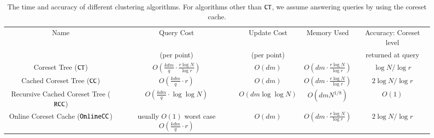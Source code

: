 \begin{table*}[ht]
{
\small
\centering
\begin{tabular}{|c| c| c| c| c|}
\hline
Name & Query Cost & Update Cost & Memory Used & Accuracy: Coreset level  \\
           & (per point)   & (per point)    & & returned at query  \\
\hline
Coreset Tree ($\texttt{CT}$) & $O\left( \frac{kdm}{q} \cdot \frac{r \log N}{\log r}\right)$ &  $O(dm)$ & $O\left(dm \cdot \frac{r \log N}{\log r}\right)$ & $\log N / \log r$ \\
\hline
Cached Coreset Tree ($\texttt{CC}$)&  $O\left(\frac{kdm}{q} \cdot r \right)$ & $O(dm)$ & $O\left(dm \cdot \frac{r\log N}{\log r} \right)$ & $2  \log N / \log r$\\
\hline
Recursive Cached Coreset Tree ($\texttt{RCC}$) & $O\left(\frac{kdm}{q} \cdot \log \log N \right)$ & $O(dm \log \log N)$ & $O(dm N^{1/8})$ & $O(1)$ \\
\hline
Online Coreset Cache ($\texttt{OnlineCC}$)  & usually $O(1)$ worst case $O\left(\frac{kdm}{q} \cdot r \right)$ & $O(dm)$ & $O\left(dm \cdot \frac{r\log N}{\log r} \right)$  & $2 \log N / \log r$  \\
\hline
\end{tabular}
\smallskip
}
\caption{The time and accuracy of different clustering algorithms. For algorithms other than $\texttt{CT}$, we assume answering queries by using the coreset cache.}
\label{table:summary}
\end{table*}
